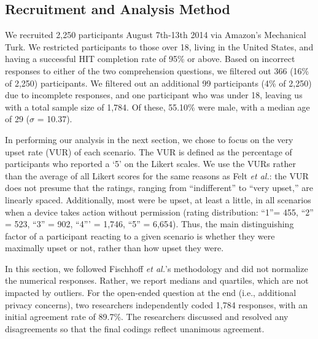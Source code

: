 \subsection{Recruitment and Analysis Method}
We recruited 2,250 participants August 7th-13th 2014 via Amazon's Mechanical Turk. We restricted participants to those over 18, living in the United States, and having a successful HIT completion rate of 95\% or above. Based on incorrect responses to either of the two comprehension questions, we filtered out 366 (16\% of 2,250) participants. We filtered out an additional 99 participants (4\% of 2,250) due to incomplete responses, and one participant who was under 18, leaving us with a total sample size of 1,784. Of these, 55.10\% were male, with a median age of 29 ($\sigma$ = 10.37).

In performing our analysis in the next section, we chose to focus on the very upset rate (VUR) of each scenario.  The VUR is defined as the percentage of participants who reported a `5' on the Likert scales. 
We use the VURs rather than the average of all Likert scores for the same reasons as Felt {\it et al.}: the VUR does not presume that the ratings, ranging from ``indifferent'' to ``very upset,'' are linearly spaced. Additionally, most were be upset, at least a little, in all scenarios when a device takes action without permission (rating distribution: ``1''= 455, ``2'' = 523, ``3'' = 902, ``4''' = 1,746, ``5'' = 6,654). Thus, the main distinguishing factor of a participant reacting to a given scenario is whether they were maximally upset or not, rather than how upset they were.

In this section, we followed Fischhoff {\it et al.}'s methodology and did not normalize the numerical responses. Rather, we report medians and quartiles, which are not impacted by outliers. For the open-ended question at the end (i.e., additional privacy concerns), two researchers independently coded 1,784 responses, with an initial agreement rate of 89.7\%. The researchers discussed and resolved any disagreements so that the final codings reflect unanimous agreement.